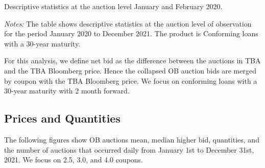 \documentclass[11pt,a4paper]{article}
\begin{document}
\begin{table}[h]
  \centering
  
  \caption{Descriptive statistics at the auction level January and February 2020. }
  \begin{minipage}{\textwidth}
      \footnotesize{\textit{Notes:} The table shows descriptive statistics at the auction level of observation for the  period January 2020 to December 2021.
     The product is Conforming loans with a 30-year maturity. } 
      \end{minipage}
\end{table}


For this analysis, we define net bid as the difference between the auctions in TBA and the TBA Bloomberg price. Hence the collapsed OB auction bids are merged by coupon with the TBA Bloomberg price. We focus on conforming loans with a 30-year maturity with 2 month forward.


\subsection{Prices and Quantities}

The following figures show OB auctions mean, median higher bid, quantities, and the number of auctions that occurred daily from January 1st to December 31st,  2021. We focus on 2.5, 3.0, and 4.0 coupons. 

\end{document}
